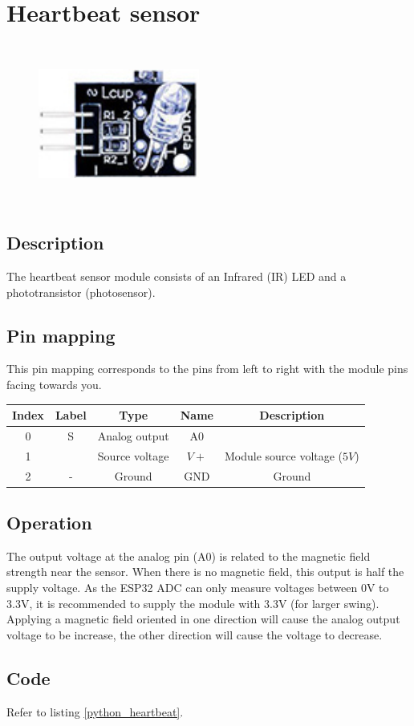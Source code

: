 \section{Heartbeat sensor}
\begin{figure}[H]
    \centering
    \includegraphics[angle=0, keepaspectratio=true, scale=1, width=200px, height=200px]{images/heartbeat.jpg}
\end{figure}
\subsection*{Description}
The heartbeat sensor module consists of an Infrared (IR) LED and a phototransistor (photosensor).
\subsection*{Pin mapping}
This pin mapping corresponds to the pins from left to right with the module pins facing towards you.
\begin{table}[H]
    \centering
    \begin{tabular}{|c|c|c|c|c|}
    \hline
    Index &Label &Type &Name &Description\\ \hline
    0 &S &Analog output &A0 &\\ \hline
    1 & &Source voltage &$V+$ &Module source voltage ($5V$)\\ \hline
    2 &- &Ground &GND &Ground\\ \hline
    \end{tabular}
\end{table}
\subsection*{Operation}
The output voltage at the analog pin (A0) is related to the magnetic field strength near the sensor. When there is no magnetic field, this output is half the supply voltage. As the ESP32 ADC can only measure voltages between 0V to 3.3V, it is recommended to supply the module with 3.3V (for larger swing). Applying a magnetic field oriented in one direction will cause the analog output voltage to be increase, the other direction will cause the voltage to decrease.
\subsection*{Code}
Refer to listing \ref{python_heartbeat}.
%